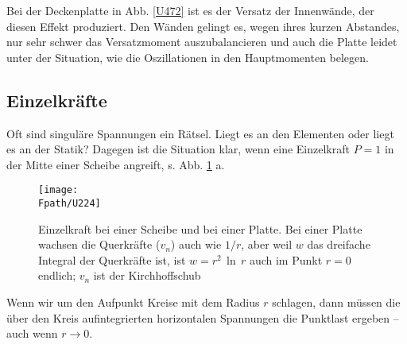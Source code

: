 Bei der Deckenplatte in Abb. \ref{U472} ist es der Versatz der Innenw\"{a}nde, der diesen Effekt produziert. Den W\"{a}nden gelingt es, wegen ihres kurzen Abstandes, nur sehr schwer das Versatzmoment auszubalancieren und auch die Platte leidet unter der Situation, wie die Oszillationen in den  Hauptmomenten belegen.

{\textcolor{sectionTitleBlue}{\section{Einzelkr\"{a}fte}}}\label{EinzelF}
Oft sind singul\"{a}re Spannungen ein R\"{a}tsel. \glq Liegt es an den Elementen oder liegt es an der Statik\grq? Dagegen ist die Situation klar, wenn eine Einzelkraft $ P = 1$ in der Mitte einer Scheibe angreift, s. Abb. \ref{U224} a.
\begin{figure}
\centering
\texttt{[image: \\Fpath/U224]}
\caption{Einzelkraft bei einer Scheibe und bei einer Platte. Bei einer Platte wachsen die Querkr\"{a}fte ($v_n$) auch wie $1/r$, aber weil $w$ das dreifache Integral der Querkr\"{a}fte ist, ist $w = r^2\,\ln\,r$ auch im Punkt $r = 0$ endlich; $v_n$ ist der Kirchhoffschub }
\label{U224}%
\end{figure}%

Wenn wir um den Aufpunkt Kreise mit dem Radius $r $ schlagen, dann m\"{u}ssen die \"{u}ber den Kreis aufintegrierten horizontalen Spannungen die Punktlast ergeben -- auch wenn $r \to 0$.

